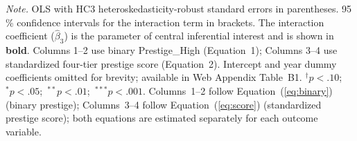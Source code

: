 \documentclass[12pt,a4paper]{article}
\begin{document}
\begin{table}[htbp]
\begin{threeparttable}
\begin{tabular}{lcccc}
\bottomrule
\end{tabular}
\begin{tablenotes}
\footnotesize
\item \textit{Note.} OLS with HC3 heteroskedasticity-robust standard errors
  in parentheses. 95\,\% confidence intervals for the interaction term in
  brackets. The interaction coefficient ($\hat{\beta}_3$) is the parameter of
  central inferential interest and is shown in \textbf{bold}.
  Columns 1--2 use binary Prestige\_High (Equation~1);
  Columns 3--4 use standardized four-tier prestige score (Equation~2).
  Intercept and year dummy coefficients omitted for brevity; available in
  Web Appendix Table~B1.
  $^{\dagger}p<.10$;\ $^{*}p<.05$;\ $^{**}p<.01$;\ $^{***}p<.001$.
  Columns~1--2 follow Equation~(\ref{eq:binary}) (binary prestige);
  Columns~3--4 follow Equation~(\ref{eq:score}) (standardized
  prestige score); both equations are estimated separately for
  each outcome variable.
\end{tablenotes}
\end{threeparttable}
\end{table}

\newpage
\end{document}
